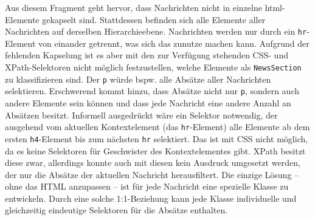     Aus diesem Fragment geht hervor,
    dass Nachrichten nicht in einzelne \gls{html}-Elemente gekapselt sind.
    Stattdessen befinden sich alle Elemente aller Nachrichten auf derselben Hierarchieebene.
    Nachrichten werden nur durch ein \texttt{hr}-Element von einander getrennt,
    was sich das {\classificationModel} zunutze machen kann.
    Aufgrund der fehlenden Kapselung ist es aber mit den zur Verfügung
    stehenden CSS- und XPath-Selektoren nicht möglich festzustellen,
    welche Elemente als \texttt{NewsSection} zu klassifizieren sind.
    Der {\cssSelector} \texttt{p} würde bspw. alle Absätze aller Nachrichten selektieren.
    Erschwerend kommt hinzu, dass Absätze nicht nur \texttt{p},
    sondern auch andere Elemente sein können und dass jede Nachricht eine andere Anzahl an Absätzen besitzt.
    Informell ausgedrückt wäre ein Selektor notwendig,
    der ausgehend vom aktuellen Kontextelement (das \texttt{hr}-Element) alle Elemente
    ab dem ersten \texttt{h4}-Element bis zum nächsten \texttt{hr} selektiert.
    Das ist mit CSS nicht möglich, da es keine Selektoren für Geschwister des Kontextelementes gibt.
    XPath besitzt diese zwar, allerdings konnte auch mit diesen kein
    Ausdruck umgesetzt werden, der nur die Absätze der aktuellen Nachricht herausfiltert.
    Die einzige Lösung -- ohne das HTML anzupassen -- ist für jede Nachricht eine spezielle Klasse zu entwickeln.
    Durch eine solche 1:1-Beziehung kann jede Klasse individuelle und gleichzeitig
    eindeutige Selektoren für die Absätze enthalten.
